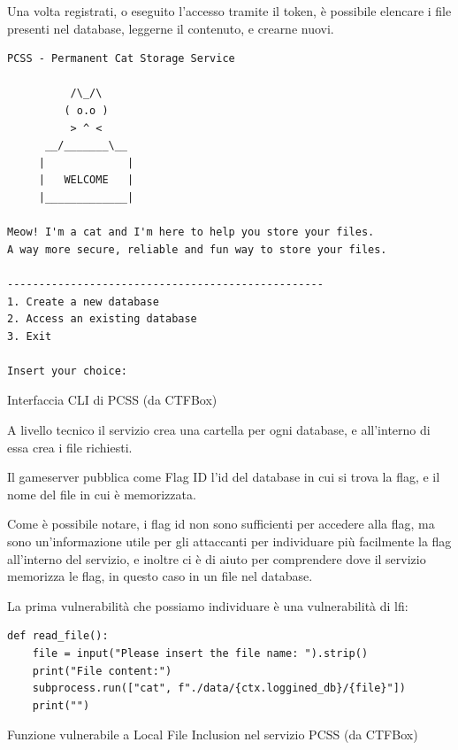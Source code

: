 Una volta registrati, o eseguito l'accesso tramite il token, è possibile elencare i file presenti nel database, leggerne il contenuto, e crearne nuovi.

\begin{listing}[H] 
\begin{verbatim}
PCSS - Permanent Cat Storage Service

          /\_/\
         ( o.o )  
          > ^ <
      __/_______\__
     |             |
     |   WELCOME   |
     |_____________|

Meow! I'm a cat and I'm here to help you store your files.
A way more secure, reliable and fun way to store your files.

--------------------------------------------------
1. Create a new database
2. Access an existing database
3. Exit

Insert your choice:
\end{verbatim}
\vspace{-1em}
\caption{Interfaccia CLI di PCSS (da CTFBox)}\label{lst:pcss_interface}
\end{listing}

A livello tecnico il servizio crea una cartella per ogni database, e all'interno di essa crea i file richiesti.

Il gameserver pubblica come Flag ID l'id del database in cui si trova la flag, e il nome del file in cui è memorizzata.

Come è possibile notare, i flag id non sono sufficienti per accedere alla flag, ma sono un'informazione utile per gli attaccanti per individuare più facilmente la flag all'interno del servizio, e inoltre ci è di aiuto per comprendere dove il servizio memorizza le flag, in questo caso in un file nel database.

La prima vulnerabilità che possiamo individuare è una vulnerabilità di \gls{lfi}:

\begin{listing}[H] 
\begin{verbatim}
def read_file():
    file = input("Please insert the file name: ").strip()
    print("File content:")
    subprocess.run(["cat", f"./data/{ctx.loggined_db}/{file}"])
    print("")
\end{verbatim}
\vspace{-1em}
\caption{Funzione vulnerabile a Local File Inclusion nel servizio PCSS (da CTFBox)}\label{lst:scorecalc}
\end{listing}

